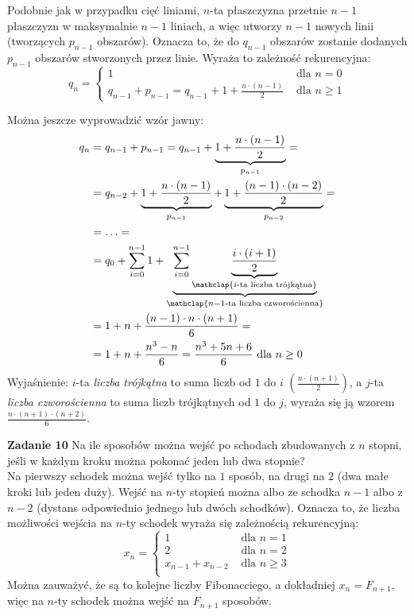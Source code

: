 \documentclass[a4paper,12pt]{article}
\begin{document}
\noindent Podobnie jak w przypadku cięć liniami, $n$-ta płaszczyzna przetnie $n - 1$ płaszczyzn w maksymalnie $n - 1$ liniach, a więc utworzy $n - 1$ nowych linii (tworzących $p_{n-1}$ obszarów). Oznacza to, że do $q_{n-1}$ obszarów zostanie dodanych $p_{n-1}$ obszarów stworzonych przez linie. Wyraża to zależność rekurencyjna:
\[ 
q_n = 
\begin{cases}
1 																	&\text{ dla } n = 0 \\
q_{n - 1} + p_{n - 1} = q_{n - 1} + 1 + \frac{n\cdot (n - 1)}{2} 	&\text{ dla } n \geq 1
\end{cases}
\]

\noindent Można jeszcze wyprowadzić wzór jawny:
\begin{align*}
	q_n &= q_{n - 1} + p_{n - 1} = q_{n - 1} + \underbrace{1 + \frac{n\cdot (n - 1)}{2}}_{p_{n-1}} = \\
		&= q_{n - 2} + \underbrace{1 + \frac{n\cdot (n - 1)}{2}}_{p_{n-1}} + \underbrace{1 + \frac{(n - 1)\cdot (n - 2)}{2}}_{p_{n-2}} = \\
		&= \ldots = \\
		&= q_0 + \sum\limits_{i = 0}^{n - 1} 1 + \underbrace{\sum\limits_{i = 0}^{n - 1} \underbrace{\frac{i \cdot (i + 1)}{2}}_{\mathclap{i\text{-ta liczba trójkątna}}}}_{\mathclap{n-1 \text{-ta liczba czworościenna}}} \\
		&= 1 + n + \frac{(n - 1)\cdot n \cdot(n + 1)}{6} = \\
		&= 1 + n + \frac{n^3 - n}{6} = \frac{n^3 + 5n + 6}{6} \text{ dla } n \geq 0
\end{align*}
\noindent Wyjaśnienie: $i$-ta \textit{liczba trójkątna} to suma liczb od $1$ do $i$ $\left(\frac{n \cdot (n + 1)}{2}\right)$, a $j$-ta \textit{liczba czworościenna} to suma liczb trójkątnych od $1$ do $j$, wyraża się ją wzorem $\frac{n\cdot(n+1)\cdot(n+2)}{6}$.


\noindent \newline \textbf{Zadanie 10} \newline
Na ile sposobów można wejść po schodach zbudowanych z $n$ stopni, jeśli w każdym kroku można pokonać jeden lub dwa stopnie? \\

\noindent Na pierwszy schodek można wejść tylko na $1$ sposób, na drugi na $2$ (dwa małe kroki lub jeden duży). Wejść na $n$-ty stopień można albo ze schodka $n-1$ albo z $n-2$ (dystans odpowiednio jednego lub dwóch schodków). Oznacza to, że liczba możliwości wejścia na $n$-ty schodek wyraża się zależnością rekurencyjną:
\[ 
x_n =
\begin{cases}
1 					&\text{ dla } n = 1\\
2 					&\text{ dla } n = 2\\
x_{n-1} + x_{n-2}	&\text{ dla } n \geq 3\\
\end{cases}
\]
\noindent Można zauważyć, że są to kolejne liczby Fibonacciego, a dokładniej $x_n = F_{n+1}$, więc na $n$-ty schodek można wejść na $F_{n+1}$ sposobów.
\end{document}
